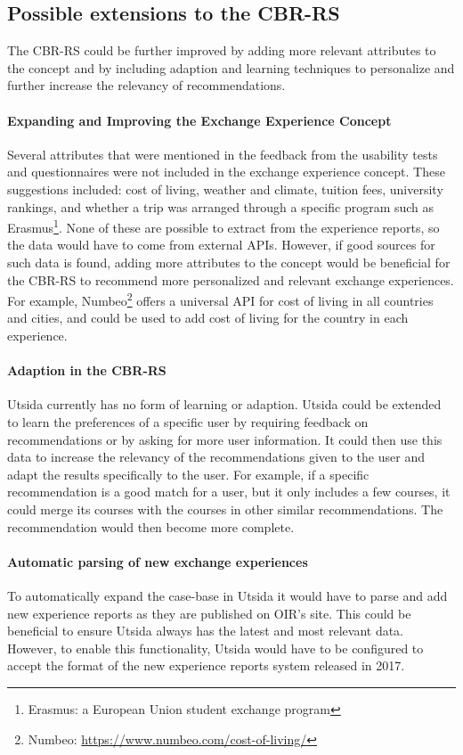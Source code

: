 \subsection{Possible extensions to the CBR-RS}
The CBR-RS could be further improved by adding more relevant attributes to the concept and by including adaption and learning techniques to personalize and further increase the relevancy of recommendations.

\paragraph{Expanding and Improving the Exchange Experience Concept} Several attributes that were mentioned in the feedback from the usability tests and questionnaires were not included in the exchange experience concept. These suggestions included: cost of living, weather and climate, tuition fees, university rankings, and whether a trip was arranged through a specific program such as Erasmus\footnote{Erasmus: a European Union student exchange program}. None of these are possible to extract from the experience reports, so the data would have to come from external APIs. However, if good sources for such data is found, adding more attributes to the concept would be beneficial for the CBR-RS to recommend more personalized and relevant exchange experiences. For example, Numbeo\footnote{Numbeo: \url{https://www.numbeo.com/cost-of-living/}} offers a universal API for cost of living in all countries and cities, and could be used to add cost of living for the country in each experience. 

\paragraph{Adaption in the CBR-RS} Utsida currently has no form of learning or adaption. Utsida could be extended to learn the preferences of a specific user by requiring feedback on recommendations or by asking for more user information. It could then use this data to increase the relevancy of the recommendations given to the user and adapt the results specifically to the user. For example, if a specific recommendation is a good match for a user, but it only includes a few courses, it could merge its courses with the courses in other similar recommendations. The recommendation would then become more complete. 

\paragraph{Automatic parsing of new exchange experiences} To automatically expand the case-base in Utsida it would have to parse and add new experience reports as they are published on OIR's site. This could be beneficial to ensure Utsida always has the latest and most relevant data. However, to enable this functionality, Utsida would have to be configured to accept the format of the new experience reports system released in 2017.  

